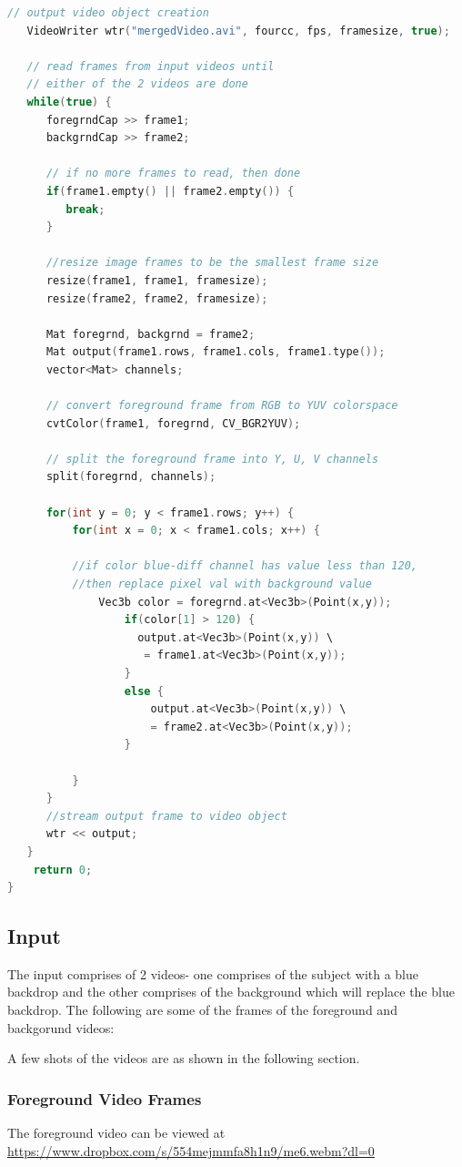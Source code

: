 \documentclass[12pt]{article}
\begin{document}
\begin{lstlisting}[language=c++]
   // output video object creation
   VideoWriter wtr("mergedVideo.avi", fourcc, fps, framesize, true);

   // read frames from input videos until 
   // either of the 2 videos are done
   while(true) { 
      foregrndCap >> frame1;
      backgrndCap >> frame2;

      // if no more frames to read, then done
      if(frame1.empty() || frame2.empty()) {
         break;
      }

      //resize image frames to be the smallest frame size
      resize(frame1, frame1, framesize);
      resize(frame2, frame2, framesize);
      
      Mat foregrnd, backgrnd = frame2;
      Mat output(frame1.rows, frame1.cols, frame1.type());
      vector<Mat> channels;
      
      // convert foreground frame from RGB to YUV colorspace
      cvtColor(frame1, foregrnd, CV_BGR2YUV);
      
      // split the foreground frame into Y, U, V channels      
      split(foregrnd, channels);
      
      for(int y = 0; y < frame1.rows; y++) {
          for(int x = 0; x < frame1.cols; x++) {
          
          //if color blue-diff channel has value less than 120, 
          //then replace pixel val with background value
              Vec3b color = foregrnd.at<Vec3b>(Point(x,y));
                  if(color[1] > 120) {
                    output.at<Vec3b>(Point(x,y)) \ 
                     = frame1.at<Vec3b>(Point(x,y));
                  }
                  else {
                      output.at<Vec3b>(Point(x,y)) \
                      = frame2.at<Vec3b>(Point(x,y));
                  }
 
          }
      }
      //stream output frame to video object
      wtr << output;
   }
    return 0;
}
\end{lstlisting}
\subsection{Input}
The input comprises of 2 videos- one comprises of the subject with a blue backdrop and the other comprises of the background which will replace the blue backdrop.
The following are some of the frames of the foreground and backgorund videos:

A few shots of the videos are as shown in the following section.


\subsubsection{Foreground Video Frames}
The foreground video can be viewed at \url{https://www.dropbox.com/s/554mejmmfa8h1n9/me6.webm?dl=0}
\end{document}
